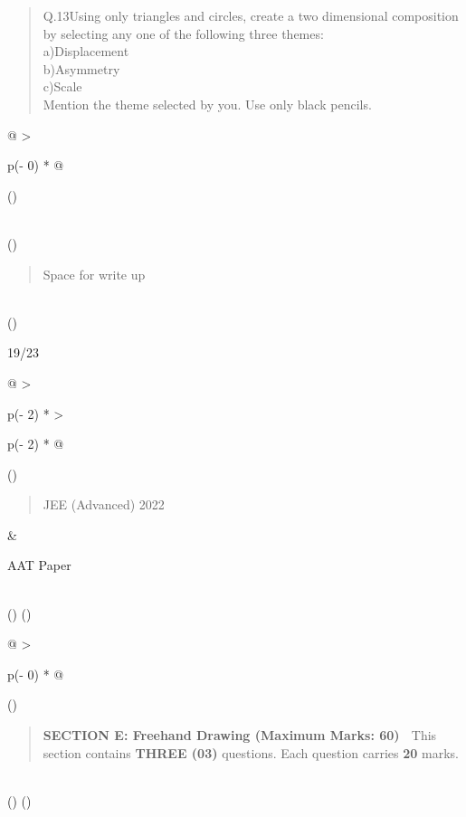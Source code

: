 \documentclass[
]{article}
\begin{document}
\begin{quote}
Q.13Using only triangles and circles, create a two dimensional
composition by selecting any one of the following three themes:\\
a)Displacement\\
b)Asymmetry\\
c)Scale\\
Mention the theme selected by you. Use only black pencils.
\end{quote}

\begin{longtable}[]{@{}
  >{\raggedright\arraybackslash}p{(\columnwidth - 0\tabcolsep) * }@{}}
\toprule()
\begin{minipage}[b]{\linewidth}\raggedright
\end{minipage} \\
\midrule()
\endhead
\begin{minipage}[t]{\linewidth}\raggedright
\begin{quote}
Space for write up
\end{quote}
\end{minipage} \\
\bottomrule()
\end{longtable}

19/23

\begin{longtable}[]{@{}
  >{\raggedright\arraybackslash}p{(\columnwidth - 2\tabcolsep) * }
  >{\raggedright\arraybackslash}p{(\columnwidth - 2\tabcolsep) * }@{}}
\toprule()
\begin{minipage}[b]{\linewidth}\raggedright
\begin{quote}
JEE (Advanced) 2022
\end{quote}
\end{minipage} & \begin{minipage}[b]{\linewidth}\raggedright
AAT Paper
\end{minipage} \\
\midrule()
\endhead
\bottomrule()
\end{longtable}

\begin{longtable}[]{@{}
  >{\raggedright\arraybackslash}p{(\columnwidth - 0\tabcolsep) * }@{}}
\toprule()
\begin{minipage}[b]{\linewidth}\raggedright
\begin{quote}
\textbf{SECTION E: Freehand Drawing (Maximum Marks: 60)}  This section
contains \textbf{THREE (03)} questions. Each question carries
\textbf{20} marks.
\end{quote}
\end{minipage} \\
\midrule()
\endhead
\bottomrule()
\end{longtable}
\end{document}
